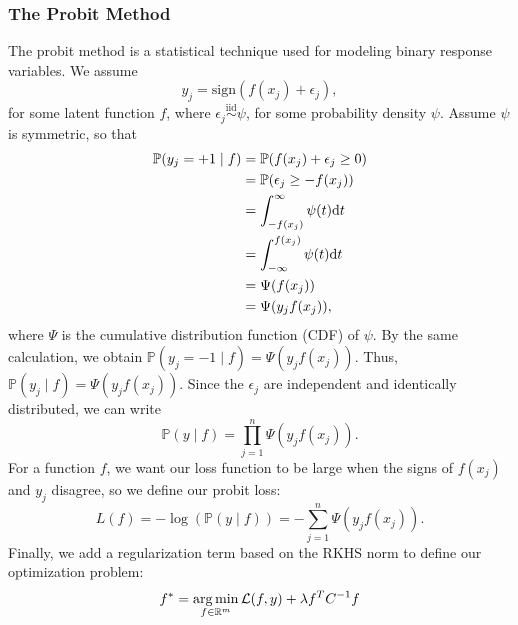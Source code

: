 \documentclass[12pt]{amsart}
\newcommand{\iid}{\overset{\mathrm{iid}}{\sim}}
\begin{document}
\subsubsection{The Probit Method}
The probit method is a statistical technique used for modeling binary response variables. We assume
\[y_j = \mathrm{sign}(f(x_j) + \epsilon_j),\]
for some latent function $f$, where $\epsilon_j\iid \psi$, for some probability density $\psi$. Assume $\psi$ is symmetric, so that
\begin{align*}
	\mathbb{P}(y_j = +1 \mid f) &= \mathbb{P}(f(x_j) + \epsilon_j \geq 0) \\
	&= \mathbb{P}(\epsilon_j \geq - f(x_j)  ) \\
	&= \int_{-f(x_j)}^\infty \psi(t) {\mathrm{d}} t \\
	&= \int_{-\infty}^{f(x_j)} \psi(t) {\mathrm{d}} t \\
	&= \Psi(f(x_j)) \\
	&= \Psi(y_jf(x_j)),
\end{align*}
where $\Psi$ is the cumulative distribution function (CDF) of $\psi$. By the same calculation, we obtain $\mathbb{P}(y_j = -1 \mid f) = \Psi(y_jf(x_j))$. Thus, $\mathbb{P}(y_j \mid f) = \Psi(y_jf(x_j))$. Since the $\epsilon_j$ are independent and identically distributed, we can write
\[\mathbb{P}(y  \mid f) = \prod_{j = 1}^n \Psi(y_jf(x_j)).\]
For a function $f$, we want our loss function to be large when the signs of $f(x_j)$ and $y_j$  disagree, so we define our probit loss:
\[L(f) = -\log(\mathbb{P}(y\mid f)) = -\sum_{j = 1}^n \Psi(y_jf(x_j)).\]
Finally, we add a regularization term based on the RKHS norm to define our optimization problem:
\[f^* = \operatorname*{arg\,min}_{f \in \mathbb{R}^{m}} \mathcal{L}(f,y) + \lambda f^{T}C^{-1}f\]
\end{document}
